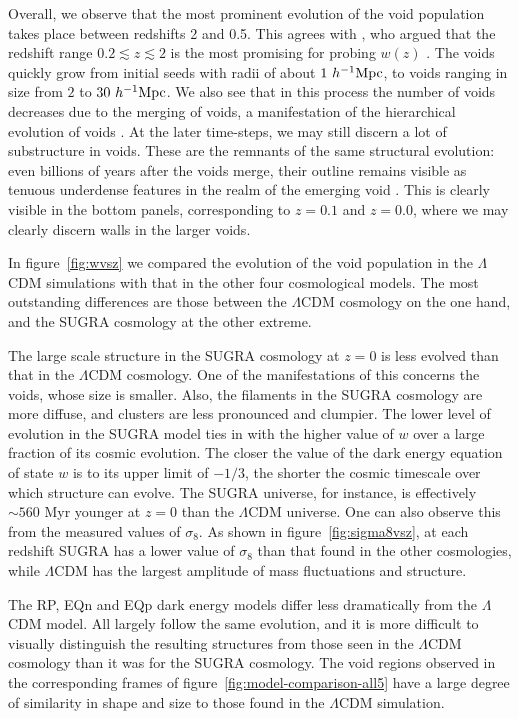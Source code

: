 Overall, we observe that the most prominent evolution of the void population takes place between redshifts 2 and 0.5. 
This agrees with \citet{huterer01}, who argued that the redshift range $0.2 \lesssim z \lesssim2$ is the most promising 
for probing $w(z)$ \citep[see also][]{hellwing10}. The voids quickly grow from initial seeds with radii of about $1 ~h^{-1} {\rm Mpc}$, 
to voids ranging in size from $2$ to $30 ~h^{-1} {\rm Mpc}$. We also see that in this process the number of voids decreases due to 
the merging of voids, a manifestation of the hierarchical evolution of voids \citep{sheth04,aragon12}. At the later 
time-steps, we may still discern a lot of substructure in voids. These are the remnants of the same structural evolution: 
even billions of years after the voids merge, their outline remains visible as tenuous underdense features in the realm of the 
emerging void \citep[see][]{sheth04}. This is clearly visible in the bottom panels, corresponding to $z=0.1$ and $z=0.0$, 
where we may clearly discern walls in the larger voids. 

In figure~\ref{fig:wvsz} we compared the evolution of the void population in the $\Lambda$CDM simulations with that 
in the other four cosmological models. The most outstanding differences are those between the $\Lambda$CDM cosmology 
on the one hand, and the SUGRA cosmology at the other extreme. 

The large scale structure in the SUGRA cosmology at $z=0$ is less evolved than that in the $\Lambda$CDM cosmology. 
One of the manifestations of this concerns the voids, whose size is smaller. Also, the filaments in the SUGRA cosmology 
are more diffuse, and clusters are less pronounced and clumpier. The lower level of evolution in the SUGRA model ties 
in with the higher value of $w$ over a large fraction of its cosmic evolution. The closer the value of the dark energy 
equation of state $w$ is to its upper limit of $-1/3$, the shorter the cosmic timescale over which structure can evolve. 
The SUGRA universe, for instance, is effectively $\sim560$ Myr younger at $z=0$ than the $\Lambda$CDM universe.
One can also observe this from the measured values of $\sigma_8$. As shown in figure~\ref{fig:sigma8vsz}, at each 
redshift SUGRA has a lower value of $\sigma_8$ than that found in the other cosmologies, while $\Lambda$CDM has the 
largest amplitude of mass fluctuations and structure. 

The RP, EQn and EQp dark energy models differ less dramatically from the $\Lambda$CDM model. All largely follow the same 
evolution, and it is more difficult to visually distinguish the resulting structures from those seen in the $\Lambda$CDM cosmology
than it was for the SUGRA cosmology. 
The void regions observed in the corresponding frames of figure~\ref{fig:model-comparison-all5} have a large degree of similarity 
in shape and size to those found in the $\Lambda$CDM simulation.  

